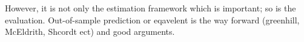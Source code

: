 \documentclass[a4paper]{article}
\begin{document}

However, it is not only the estimation framework which is important; so is the evaluation. Out-of-sample prediction or eqavelent is the way forward (greenhill, McEldrith, Shcordt ect) and good arguments.








\end{document}
